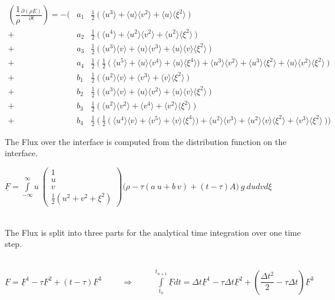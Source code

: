 \documentclass[
	pdftex,             %
	12pt,				%
	a4paper,		   	%
	english,				%
	oneside,			%
]{article}
\newcommand{\mom}[1]{\langle #1 \rangle}
\newcommand{\uu}[1]{\underline{#1}}
\begin{document}
\begin{eqnarray*}
\left( \dfrac{1}{\rho} \frac{\partial (\rho E)}{\partial t} \right)
=
-%
\Bigg(
 &a_1& \frac{1}{2}~ \Big(~ \mom{u^3} + \mom{u}\mom{v^2} + \mom{u}\mom{\xi^2} ~\Big) \\
+&a_2& \frac{1}{2}~ \Big(~ \mom{u^4} + \mom{u^2}\mom{v^2} + \mom{u^2}\mom{\xi^2} ~\Big) \\
+&a_3& \frac{1}{2}~ \Big(~ \mom{u^3}\mom{v} + \mom{u}\mom{v^3} + \mom{u}\mom{v}\mom{\xi^2} ~\Big) \\
+&a_4& \frac{1}{2}~ \Big(~ \frac{1}{2}~
					\big(~ \mom{u^5} + \mom{u}\mom{v^4} + \mom{u}\mom{\xi^4} \big)
						 + \mom{u^3}\mom{v^2} + \mom{u^3}\mom{\xi^2} + \mom{u}\mom{v^2}\mom{\xi^2}
					~\Big)
\\
+&b_1& \frac{1}{2}~ \Big(~ \mom{u^2}\mom{v} + \mom{v^3} + \mom{v}\mom{\xi^2} ~\Big) \\
+&b_2& \frac{1}{2}~ \Big(~ \mom{u^3}\mom{v} + \mom{u}\mom{v^2} + \mom{u}\mom{v}\mom{\xi^2} ~\Big) \\
+&b_3& \frac{1}{2}~ \Big(~ \mom{u^2}\mom{v^2} + \mom{v^4} + \mom{v^2}\mom{\xi^2} ~\Big) \\
+&b_4& \frac{1}{2}~ \Big(~ \frac{1}{2}~
					\big(~  \mom{u^4}\mom{v} +\mom{v^5} + \mom{v}\mom{\xi^4} \big)
						 + \mom{u^2}\mom{v^3} + \mom{u^2}\mom{v}\mom{\xi^2} + \mom{v^3}\mom{\xi^2}
					~\Big)
\Bigg)
\end{eqnarray*}

\clearpage

The Flux over the interface is computed from the distribution function on the interface. 

\begin{math}
\uu{F} = 
\int \limits_{-\infty}^{\infty}
u~
\begin{pmatrix}
	1 \\ u \\ v \\ \frac{1}{2} (u^2 + v^2 + \xi^2)
\end{pmatrix}
\Big(
	\rho - \tau (a~u + b~v) + (t-\tau)A
\Big)
~g~ du dv d\xi
\end{math}

~\\

The Flux is split into three parts for the analytical time integration over one time step. 

~\\

\begin{math}
\uu{F} = \uu{F}^1 - \tau \uu{F}^2 + (t - \tau) \uu{F}^3
\hspace{1cm} \Rightarrow \hspace{1cm}
\int \limits_{t_n}^{t_{n+1}} \uu{F} dt 
= \Delta t\uu{F}^1 
- \tau \Delta t \uu{F}^2 
+ \left( \dfrac{\Delta t^2}{2} - \tau \Delta t \right) \uu{F}^3
\end{math}
\end{document}
